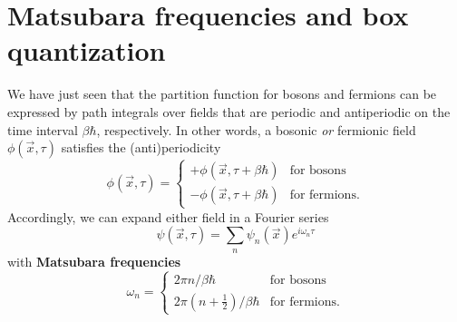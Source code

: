 \iffalse
The partition function is therefore
\begin{equation}
\begin{split}
	Z &= \int \dif \psi_0^\dagger \int \dif \psi_0 \, e^{-\psi_{n+1}^\dagger \psi_{n+1}} \braket{-\psi_0 | e^{-\beta(\hat{H} - \mu \hat{N})} | \psi_0} \\
	  &= \prod_n \int \dif \psi_n^\dagger \int \dif \psi_n \, e^{-\psi_{n+1}^\dagger \psi_{n+1}} \braket{\psi_{n+1} | e^{-(\hat{H} - \mu \hat{N}) \Delta \tau / \hbar} | \psi_n} \\
	  &= \prod_n \int \dif \psi_n^\dagger \int \dif \psi_n \, e^{-\psi_{n+1}^\dagger \psi_{n+1}} \braket{\psi_{n+1} | \psi_n} e^{-(H_n - \mu N) \Delta \tau / \hbar} \\
	  &= \prod_n \int \dif \psi_n^\dagger \int \dif \psi_n \, \exp \left\{ -\frac{\Delta t}{\hbar} \sum_n \int \dif^3 x \left( \psi^\dagger_{n+1} \frac{\psi_{n+1} - \psi_n}{\Delta t} + \ham - \mu \numdensity \right) \right\} \\
	  &= \oint_- \pathintdif \psi^\dagger \oint_- \pathintdif \psi \exp \left\{ \frac{1}{\hbar} \int_0^{\beta \hbar} \dif \tau \int \dif^3 x \left( -\psi^\dagger(\vec{x},\tau) \dot{\psi}(\vec{x},\tau) - \ham \left( \psi^\dagger(\vec{x},\tau), \psi(\vec{x},\tau) \right) + \mu \numdensity \right) \right\} \\
\end{split}
\end{equation}
\fi

\section{Matsubara frequencies and box quantization}
\label{sec:matsubara_quantization}

We have just seen that the partition function for bosons and fermions can be expressed by path integrals over fields that are periodic and antiperiodic on the time interval $\beta \hbar$, respectively.
In other words, a bosonic \emph{or} fermionic field $\phi(\vec{x}, \tau)$ satisfies the (anti)periodicity
\begin{equation}
	\phi(\vec{x}, \tau) = \begin{cases}
						      + \phi(\vec{x}, \tau + \beta \hbar) & \text{for bosons} \\
						      - \phi(\vec{x}, \tau + \beta \hbar) & \text{for fermions} .
	                      \end{cases}
\label{eq:tft:periodicity}
\end{equation}
Accordingly, we can expand either field in a Fourier series
\begin{equation}
	\psi(\vec{x}, \tau) = \sum_n \psi_n(\vec{x}) e^{i \omega_n \tau}
\end{equation}
with \textbf{Matsubara frequencies} 
\begin{equation}
	\omega_n = \begin{cases}
			       2 \pi n / \beta \hbar    & \text{for bosons} \\
				   2 \pi (n+\frac12) / \beta \hbar & \text{for fermions} .
	           \end{cases}
\label{eq:tft:matsubara_frequencies}
\end{equation}

